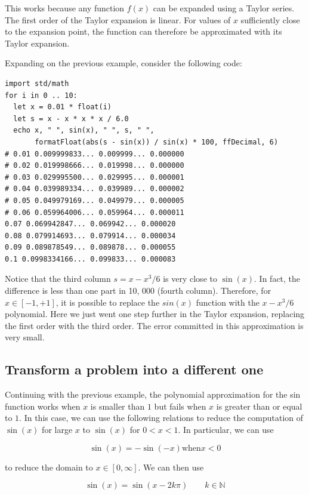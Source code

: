 \documentclass[justified, sixbynine]{tufte-book}
\theoremstyle{plain}%
\newtheorem * {corollary}{Corollary}
\theoremstyle{definition}
\theoremstyle{remark}
\newtheorem * {remark}{Remark}
\newtheorem * {note}{Note}
\begin{document}
\begin{fullwidth}
This works because any function $f(x)$ can be expanded using a Taylor series. The first order of the Taylor expansion is linear. For values of $x$ sufficiently close to the expansion point, the function can therefore be approximated with its Taylor expansion.

Expanding on the previous example, consider the following code:

\begin{lstlisting}
import std/math
for i in 0 .. 10:
  let x = 0.01 * float(i)
  let s = x - x * x * x / 6.0
  echo x, " ", sin(x), " ", s, " ",
       formatFloat(abs(s - sin(x)) / sin(x) * 100, ffDecimal, 6)
# 0.01 0.009999833... 0.009999... 0.000000
# 0.02 0.019998666... 0.019998... 0.000000
# 0.03 0.029995500... 0.029995... 0.000001
# 0.04 0.039989334... 0.039989... 0.000002
# 0.05 0.049979169... 0.049979... 0.000005
# 0.06 0.059964006... 0.059964... 0.000011
0.07 0.069942847... 0.069942... 0.000020
0.08 0.079914693... 0.079914... 0.000034
0.09 0.089878549... 0.089878... 0.000055
0.1 0.0998334166... 0.099833... 0.000083
\end{lstlisting}

Notice that the third column $s = x - x^3/6$ is very close to $\sin(x)$. In fact, the difference is less than one part in 10, 000 (fourth column). Therefore, for $x \in [-1, +1]$, it is possible to replace the $sin(x)$ function with the $x-x^3/6$ polynomial. Here we just went one step further in the Taylor expansion, replacing the first order with the third order. The error committed in this approximation is very small.


\goodbreak\subsection{Transform a problem into a different one}

Continuing with the previous example, the polynomial approximation for the sin function works when $x$ is smaller than $1$ but fails when $x$ is greater than or equal to $1$. In this case, we can use the following relations to reduce the computation of $\sin(x)$ for large $x$ to $\sin(x)$ for $0<x<1$. In particular, we can use

\begin{equation}
\sin(x) = -\sin(-x) \textrm{when} x < 0
\end{equation}

to reduce the domain to $x \in [0, \infty]$. We can then use

\begin{equation}
\sin(x) = \sin(x - 2k\pi) \qquad k\in \mathbb{N}
\end{equation}


\end{fullwidth}
\end{document}
